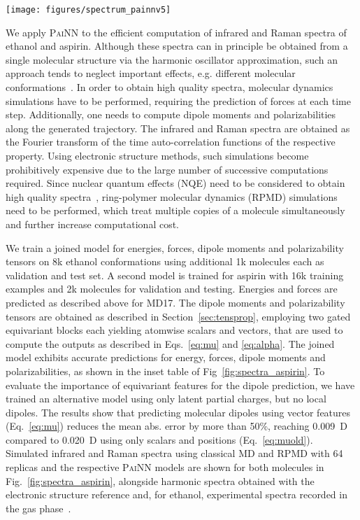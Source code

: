 \documentclass[reprint,
amsmath,amssymb,
 aip,jcp
]{revtex4-2}
\newcommand{\painn}{\textsc{PaiNN}}
\newcommand{\new}[1]{#1}
\begin{document}
\begin{figure*}[tb]
    \centering
    \texttt{[image: figures/spectrum\_painnv5]}
    \caption{IR (top) and Raman (bottom) spectra of ethanol and aspirin. \new{Spectra calculated with the reference method using the harmonic oscillator approximation are shown in black (QM harmonic).} The inset table shows the mean absolute errors on the respective test set.}
    \label{fig:spectra_aspirin}
\end{figure*}

We apply \painn{} to the efficient computation of infrared and Raman spectra of ethanol and aspirin.
\new{Although these spectra can in principle be obtained from a single molecular structure via the harmonic oscillator approximation, such an approach tends to neglect important effects, e.g. different molecular conformations~\cite{thomas2013computing}.
In order to obtain high quality spectra,}
molecular dynamics simulations have to be performed, requiring the prediction of forces at each time step.
Additionally, one needs to compute dipole moments and polarizabilities along the generated trajectory.
The infrared and Raman spectra are obtained as the Fourier transform of the time auto-correlation functions of the respective property.
Using electronic structure methods, such simulations become prohibitively expensive due to the large number of successive computations required.
Since nuclear quantum effects (NQE) need to be considered to obtain high quality spectra~\cite{sauceda2021dynamical}, ring-polymer molecular dynamics (RPMD) simulations need to be performed, which treat multiple copies of a molecule simultaneously and further increase computational cost.
 
We train a joined model for energies, forces, dipole moments and polarizability tensors on 8k ethanol conformations using additional 1k molecules each as validation and test set.
A second model is trained for aspirin with 16k training examples and 2k molecules for validation and testing.
Energies and forces are predicted as described above for MD17.
The dipole moments and polarizability tensors are obtained as described in Section~\ref{sec:tensprop}, employing two gated equivariant blocks each yielding atomwise scalars and vectors, that are used to compute the outputs as described in Eqs.~\ref{eq:mu} and \ref{eq:alpha}.
The joined model exhibits accurate predictions for energy, forces, dipole moments and polarizabilities, as shown in the inset table of Fig~\ref{fig:spectra_aspirin}.
\new{To evaluate the importance of equivariant features for the dipole prediction, we have trained an alternative model using only latent partial charges, but no local dipoles. The results show that predicting molecular dipoles using vector features (Eq.~\ref{eq:mu}) reduces the mean abs. error by more than 50\%, reaching 0.009~D compared to 0.020~D using only scalars and positions (Eq.~\ref{eq:muold}).}
Simulated infrared and Raman spectra using classical MD and RPMD with 64 replicas \new{and the respective \painn{} models} are shown for both molecules in Fig.~\ref{fig:spectra_aspirin}, alongside \new{harmonic} spectra obtained with the electronic structure reference and, for ethanol, experimental spectra recorded in the gas phase~\cite{NIST,kiefer2017simultaneous}.
\end{document}
